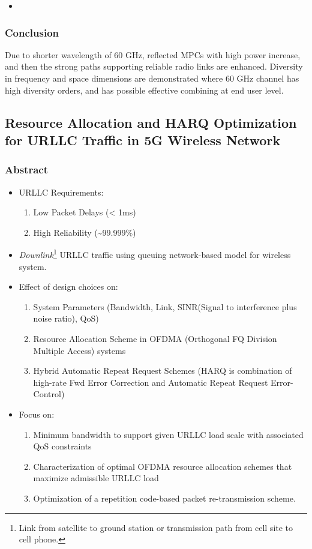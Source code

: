 \documentclass[11pt]{article}
\begin{document}
\begin{enumerate}
\begin{enumerate}
\begin{center}
\end{center}
\begin{itemize}
\item 
\end{itemize}
\end{enumerate}
\end{enumerate}
\subsubsection{Conclusion}
\label{sec:org525ff5a}
Due to shorter wavelength of 60 GHz, reflected MPCs with high power increase, and then the strong paths supporting reliable radio links are enhanced. Diversity in frequency and space dimensions are demonstrated where 60 GHz channel has high diversity orders, and has possible effective combining at end user level.
\subsection{Resource Allocation and HARQ Optimization for URLLC Traffic in 5G Wireless Network}
\label{sec:org58fdda3}
\subsubsection{Abstract}
\label{sec:org276ca3b}
\begin{itemize}
\item URLLC Requirements:
\begin{enumerate}
\item Low Packet Delays (< 1ms)
\item High Reliability (\textasciitilde{}99.999\%)
\end{enumerate}
\item \emph{Downlink}\footnote{Link from satellite to ground station or transmission path from cell site to cell phone.} URLLC traffic using queuing network-based model for wireless system.
\item Effect of design choices on:
\begin{enumerate}
\item System Parameters (Bandwidth, Link, SINR(Signal to interference plus noise ratio), QoS)
\item Resource Allocation Scheme in OFDMA (Orthogonal FQ Division Multiple Access) systems
\item Hybrid Automatic Repeat Request Schemes (HARQ is combination of high-rate Fwd Error Correction and Automatic Repeat Request Error-Control)
\end{enumerate}
\item Focus on:
\begin{enumerate}
\item Minimum bandwidth to support given URLLC load scale with associated QoS constraints
\item Characterization of optimal OFDMA resource allocation schemes that maximize admissible URLLC load
\item Optimization of a repetition code-based packet re-transmission scheme.
\end{enumerate}
\end{itemize}
\end{document}
